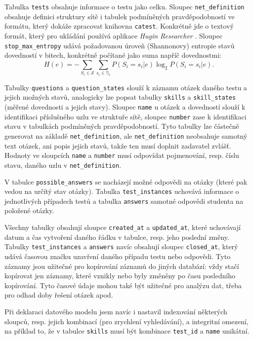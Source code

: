 \documentclass[a4paper,twoside,12pt]{scrbook}
\begin{document}
Tabulka \texttt{tests} obsahuje informace o testu jako celku. Sloupec \texttt{net\_definition} obsahuje definici struktury sítě i tabulek podmíněných pravděpodobností ve formátu, který dokáže zpracovat knihovna \texttt{catest}. Konkrétně jde o textový formát, který pro ukládání používá aplikace \textit{Hugin Researcher} \cite{hugin}. Sloupec \texttt{stop\_max\_entropy} udává požadovanou úroveň (Shannonovy) entropie stavů dovedností v bitech, konkrétně počítané jako suma napříč dovednostmi:
\begin{equation}
	H(e) = -\sum_{S_i \in \mathcal{S}}\sum_{s_i \in \mathbb{S}_i}P(S_i=s_i|e) \log_2 P(S_i=s_i|e).
\end{equation}

Tabulky \texttt{questions} a \texttt{question\_states} slouží k záznamu otázek daného testu a jejich možných stavů, analogicky lze popsat tabulky \texttt{skills} a \texttt{skill\_states} (měřené dovednosti a jejich stavy). Sloupec \texttt{name} u otázek a dovedností slouží k identifikaci příslušného uzlu ve struktuře sítě, sloupec \texttt{number} zase k identifikaci stavu v tabulkách podmíněných pravděpodobností. Tyto tabulky lze částečně generovat na základě \texttt{net\_definition}, ale \texttt{net\_definition} neobsahuje samotný text otázek, ani popis jejich stavů, takže ten musí doplnit zadavatel zvlášť. Hodnoty ve sloupcích \texttt{name} a \texttt{number} musí odpovídat pojmenování, resp. číslu stavu, daného uzlu v \texttt{net\_definition}.

V tabulce \texttt{possible\_answers} se nacházejí možné odpovědi na otázky (které pak vedou na určítý stav otázky). Tabulka \texttt{test\_instances} uchovává informace o jednotlivých případech testů a tabulka \texttt{answers} samotné odpovědi studenta na položené otázky.

Všechny tabulky obsahují sloupce \texttt{created\_at} a \texttt{updated\_at}, které uchovávají datum a čas vytvoření daného řádku v tabulce, resp. jeho poslední změny. Tabulky \texttt{test\_instances} a \texttt{answers} navíc obsahují sloupec \texttt{closed\_at}, který udává časovou značku uzavření daného případu testu nebo odpovědi. Tyto záznamy jsou užitečné pro kopírování záznamů do jiných databází: vždy stačí kopírovat jen záznamy, které vznikly nebo byly změněny po času posledního kopírování. Tyto časové údaje mohou také být užitečné pro analýzu dat, třeba pro odhad doby řešení otázek apod.

Při deklaraci datového modelu jsem navíc i nastavil indexování některých sloupců, resp. jejich kombinací (pro zrychlení vyhledávání), a integritní omezení, na příklad to, že v tabulce \texttt{skills} musí být kombinace \texttt{test\_id} a \texttt{name} unikátní.
\end{document}

